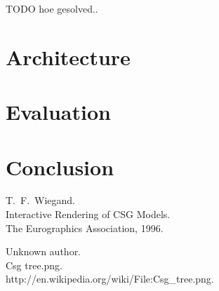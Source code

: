 \documentclass[a4paper,10pt,twoside]{report}
\begin{document}
TODO hoe gesolved..

\chapter{Architecture}



\chapter{Evaluation}

\chapter{Conclusion}


\begin{thebibliography}{99}
    T.~F.~Wiegand.\\
    Interactive Rendering of CSG Models.\\
    The Eurographics Association, 1996.

    Unknown author.\\
    Csg tree.png.\\
    http://en.wikipedia.org/wiki/File:Csg\_tree.png.\\
\end{thebibliography}
\end{document}
